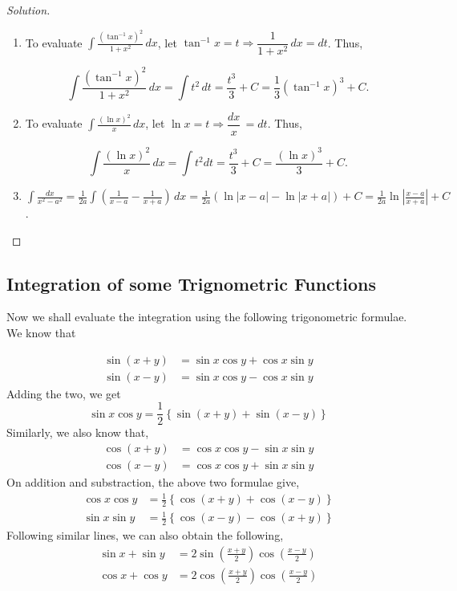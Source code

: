 \documentclass{book}
\theoremstyle{definition}
\newenvironment{solution}
    {\begin{proof}[Solution]}
    {\end{proof}}
\begin{document}
\begin{solution}
\begin{enumerate}[label=(\roman*)]
\[
\int xe^{x^2} \, dx =\frac{1}{2}\int 2xe^{x^2}dx = \frac{1}{2}\int e^tdt= \frac{1}{2}e^t+C=\frac{1}{2}e^{x^2}+C.
\]

\item To evaluate $\displaystyle\int \frac{(\tan^{-1}x)^2}{1+x^2} \, dx$, let $\tan^{-1}x=t \Rightarrow \dfrac{1}{1+x^2} \, dx=dt$. Thus,

\[
\int \frac{(\tan^{-1}x)^2}{1+x^2} \, dx=\int t^2\,dt = \frac{t^3}{3}+C=\frac{1}{3}(\tan^{-1}x)^3+C.
\]

\item To evaluate $\displaystyle\int\frac{(\ln x)^2}{x} \, dx$, let $\ln x=t \Rightarrow \dfrac{dx}{x} \,=dt$. Thus,

\[
\int \frac{(\ln x)^2}{x} \, dx =\int t^2dt= \frac{t^3}{3}+C=\displaystyle\frac{(\ln x)^3}{3}+C.
\]

\item $\displaystyle\int\frac{dx}{x^2-a^2} =\frac{1}{2a}\displaystyle\int \left(\frac{1}{x-a}-\frac{1}{x+a}\right) \,dx=\frac{1}{2a}(\ln|x-a|-\ln|x+a|)+C=\frac{1}{2a}\ln|
\frac{x-a}{x+a}|+C$.

\end{enumerate}
\end{solution}

\subsection{Integration of some Trignometric Functions}

Now we shall evaluate the integration using the following trigonometric formulae. We know that

\begin{align*}
    \sin (x+y)&=\sin x\cos y+\cos x\sin y \\ 
    \sin (x-y)&=\sin x\cos y-\cos x\sin y
\end{align*}
Adding the two, we get
\[
\sin x\cos y=\frac{1}{2}\left\{\sin (x+y)+\sin (x-y)\right\}
\]
Similarly, we also know that, 
\begin{align*}
    \cos (x+y)&=\cos x\cos y-\sin x\sin y \\
    \cos (x-y)&=\cos x\cos y+\sin x\sin y
\end{align*}
On addition and substraction, the above two formulae give,
\begin{align*}
    \cos x\cos y &= \frac{1}{2}\left\{\cos (x+y)+\cos(x-y)\right\} \\ 
    \sin x\sin y &= \frac{1}{2}\left\{\cos (x-y)-\cos(x+y)\right\}
\end{align*}
Following similar lines, we can also obtain the following,
\begin{align*}
    \sin x+\sin y &= 2\sin\left(\frac{x+y}{2}\right)\cos\left(\frac{x-y}{2}\right) \\
    \cos x+\cos y &= 2\cos\left(\frac{x+y}{2}\right)\cos\left(\frac{x-y}{2}\right)
\end{align*}
\end{document}
